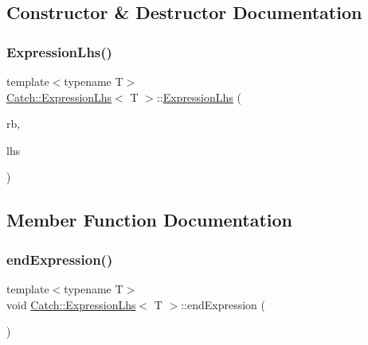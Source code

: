 \subsection{Constructor \& Destructor Documentation}
\hypertarget{class_catch_1_1_expression_lhs_aa829588def6146a94fb75de9c4cc482a}{}\label{class_catch_1_1_expression_lhs_aa829588def6146a94fb75de9c4cc482a} 
\subsubsection{\texorpdfstring{Expression\+Lhs()}{ExpressionLhs()}}
{\footnotesize\ttfamily template$<$typename T$>$ \\
\hyperlink{class_catch_1_1_expression_lhs}{Catch\+::\+Expression\+Lhs}$<$ T $>$\+::\hyperlink{class_catch_1_1_expression_lhs}{Expression\+Lhs} (\begin{DoxyParamCaption}\item[{\hyperlink{class_catch_1_1_result_builder}{Result\+Builder} \&}]{rb,  }\item[{T}]{lhs }\end{DoxyParamCaption})\hspace{0.3cm}{\ttfamily [inline]}}



\subsection{Member Function Documentation}
\hypertarget{class_catch_1_1_expression_lhs_a13d2551a927790284fb5ddf1ee2c9079}{}\label{class_catch_1_1_expression_lhs_a13d2551a927790284fb5ddf1ee2c9079} 
\subsubsection{\texorpdfstring{end\+Expression()}{endExpression()}}
{\footnotesize\ttfamily template$<$typename T$>$ \\
void \hyperlink{class_catch_1_1_expression_lhs}{Catch\+::\+Expression\+Lhs}$<$ T $>$\+::end\+Expression (\begin{DoxyParamCaption}{ }\end{DoxyParamCaption})\hspace{0.3cm}{\ttfamily [inline]}}

